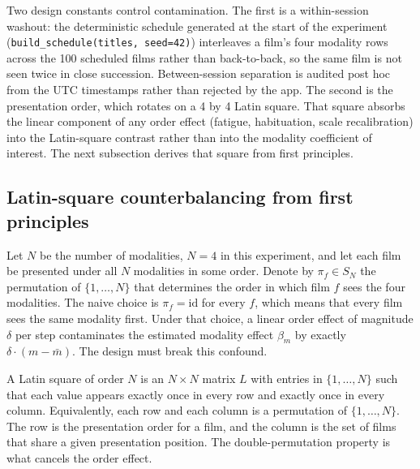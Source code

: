 \documentclass{article}
\begin{document}
Two design constants control contamination. The first is a within-session washout: the deterministic schedule generated at the start of the experiment (\texttt{build\_schedule(titles, seed=42)}) interleaves a film's four modality rows across the 100 scheduled films rather than back-to-back, so the same film is not seen twice in close succession. Between-session separation is audited post hoc from the UTC timestamps rather than rejected by the app. The second is the presentation order, which rotates on a 4 by 4 Latin square. That square absorbs the linear component of any order effect (fatigue, habituation, scale recalibration) into the Latin-square contrast rather than into the modality coefficient of interest. The next subsection derives that square from first principles.

\subsection{Latin-square counterbalancing from first principles}

Let $N$ be the number of modalities, $N = 4$ in this experiment, and let each film be presented under all $N$ modalities in some order. Denote by $\pi_f \in S_N$ the permutation of $\{1, \ldots, N\}$ that determines the order in which film $f$ sees the four modalities. The naive choice is $\pi_f = \mathrm{id}$ for every $f$, which means that every film sees the same modality first. Under that choice, a linear order effect of magnitude $\delta$ per step contaminates the estimated modality effect $\beta_m$ by exactly $\delta \cdot (m - \bar m)$. The design must break this confound.

A Latin square of order $N$ is an $N \times N$ matrix $L$ with entries in $\{1, \ldots, N\}$ such that each value appears exactly once in every row and exactly once in every column. Equivalently, each row and each column is a permutation of $\{1, \ldots, N\}$. The row is the presentation order for a film, and the column is the set of films that share a given presentation position. The double-permutation property is what cancels the order effect.
\end{document}
